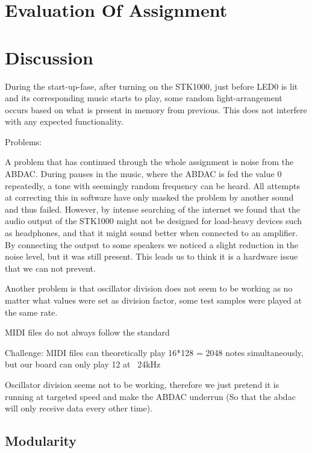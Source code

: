 \documentclass[a4paper,12pt]{article}
\begin{document}
\clearpage
\section{Evaluation Of Assignment}

\clearpage
\section{Discussion}

During the start-up-fase, after turning on the STK1000, just before LED0 is lit and its corresponding music starts to play, some random light-arrangement occurs based on what is present in memory from previous. This does not interfere with any expected functionality.      


Problems:

A problem that has continued through the whole assignment is noise from the ABDAC. During pauses in the music, where the ABDAC is fed the value 0 repeatedly, a tone with seemingly random frequency can be heard. All attempts at correcting this in software have only masked the problem by another sound and thus failed. However, by intense searching of the internet we found that the audio output of the STK1000 might not be designed for load-heavy devices such as headphones, and that it might sound better when connected to an amplifier\cite{impedance}. By connecting the output to some speakers we noticed a slight reduction in the noise level, but it was still present. This leads us to think it is a hardware issue that we can not prevent.

Another problem is that oscillator division does not seem to be working as no matter what values were set as division factor, some test samples were played at the same rate.

MIDI files do not always follow the standard

Challenge: MIDI files can theoretically play 16*128 = 2048 notes simultaneously, but our board can only play 12 at ~24kHz

Oscillator division seems not to be working, therefore we just pretend it is running at targeted speed and make the ABDAC underrun (So that the abdac will only receive data every other time).

\subsection{Modularity}



\clearpage
\end{document}

